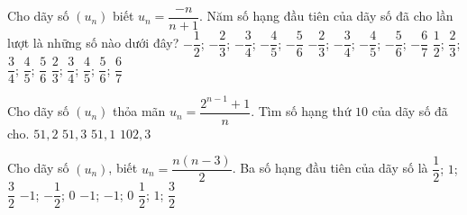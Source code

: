 \begin{ex}%
	Cho dãy số $(u_n)$ biết $u_n=\dfrac{-n}{n+1}$. Năm số hạng đầu tiên của dãy số đã  cho lần lượt là những số nào dưới đây?
	\choice 
		{\True $-\dfrac{1}{2}$;  $-\dfrac{2}{3}$; $-\dfrac{3}{4}$; $-\dfrac{4}{5}$; $-\dfrac{5}{6}$}
		{$-\dfrac{2}{3}$;  $-\dfrac{3}{4}$; $-\dfrac{4}{5}$; $-\dfrac{5}{6}$; $-\dfrac{6}{7}$}
		{$\dfrac{1}{2}$; $\dfrac{2}{3}$; $\dfrac{3}{4}$;  $\dfrac{4}{5}$; $\dfrac{5}{6}$}
		{$\dfrac{2}{3}$; $\dfrac{3}{4}$; $\dfrac{4}{5}$; $\dfrac{5}{6}$;  $\dfrac{6}{7}$}
\end{ex}

\begin{ex}%
	Cho dãy số $(u_n)$ thỏa mãn $u_n=\dfrac{2^{n-1}+1}{n}$. Tìm số hạng thứ $10$  của dãy số đã cho.
	 \choice
		{$51{,}2$} 
		{\True  $51{,}3$}
		{$51{,}1$} 
		 {$102{,}3$}
\end{ex}

\begin{ex}%
	Cho dãy số $(u_n)$, biết $u_n=\dfrac{n(n-3)}{2}$. Ba số hạng đầu tiên của dãy số là 
	 \choice
		{$\dfrac{1}{2}$;  $1$; $\dfrac{3}{2}$}
		{$-1$; $-\dfrac{1}{2}$; $0$} 
		{\True $-1$; $-1$;  $0$}
		{$\dfrac{1}{2}$; $1$;  $\dfrac{3}{2}$}
\end{ex}

